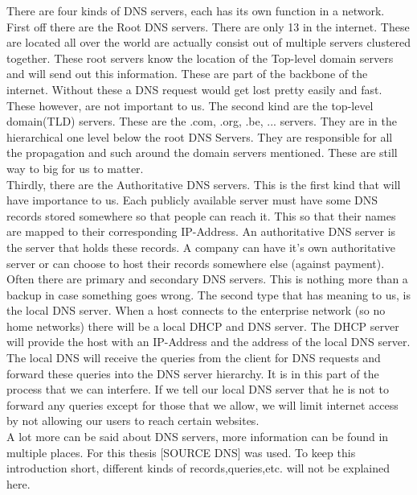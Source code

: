 There are four kinds of DNS servers, each has its own function in a network.\\
First off there are the Root DNS servers. There are only 13 in the internet. These are located all over the world are actually consist out of multiple servers clustered together. These root servers know the location of the Top-level domain servers and will send out this information. These are part of the backbone of the internet. Without these a DNS request would get lost pretty easily and fast. These however, are not important to us. 
The second kind are the top-level domain(TLD) servers. These are the .com, .org, .be, ... servers. They are in the hierarchical  one level below the root DNS Servers. They are responsible for all the propagation and such around the domain servers mentioned. These are still way to big for us to matter.\\
Thirdly, there are the Authoritative DNS servers. This is the first kind that will have importance to us. Each publicly available server must have some DNS records stored somewhere so that people can reach it. This so that their names are mapped to their corresponding IP-Address. An authoritative DNS server is the server that holds these records. A company can have it's own authoritative server or can choose to host their records somewhere else (against payment). Often there are primary and secondary DNS servers. This is nothing more than a backup in case something goes wrong.
The second type that has meaning to us, is the local DNS server. When a host connects to the enterprise network (so no home networks) there will be a local DHCP and DNS server. The DHCP server will provide the host with an IP-Address and the address of the local DNS server. The local DNS will receive the queries from the client for DNS requests and forward these queries into the DNS server hierarchy. It is in this part of the process that we can interfere. If we tell our local DNS server that he is not to forward any queries except for those that we allow, we will limit internet access by not allowing our users to reach certain websites.\\
A lot more can be said about DNS servers, more information can be found in multiple places. For this thesis [SOURCE DNS] was used. To keep this introduction short, different kinds of records,queries,etc. will not be explained here.

